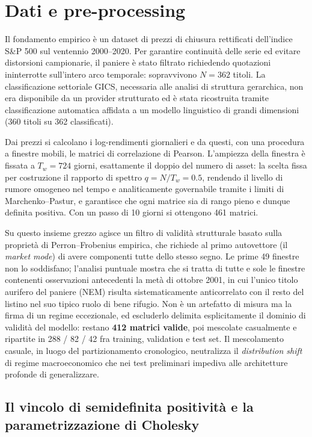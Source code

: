\documentclass[11pt,a4paper]{article}
\begin{document}
\section{Dati e pre-processing}

Il fondamento empirico è un dataset di prezzi di chiusura rettificati
dell'indice S\&P 500 sul ventennio 2000--2020. Per garantire continuità delle
serie ed evitare distorsioni campionarie, il paniere è stato filtrato
richiedendo quotazioni ininterrotte sull'intero arco temporale: sopravvivono
$N = 362$ titoli. La classificazione settoriale GICS, necessaria alle analisi
di struttura gerarchica, non era disponibile da un provider strutturato ed è
stata ricostruita tramite classificazione automatica affidata a un modello
linguistico di grandi dimensioni (360 titoli su 362 classificati).

Dai prezzi si calcolano i log-rendimenti giornalieri e da questi, con una
procedura a finestre mobili, le matrici di correlazione di Pearson. L'ampiezza
della finestra è fissata a $T_w = 724$ giorni, esattamente il doppio del
numero di asset: la scelta fissa per costruzione il rapporto di spettro
$q = N/T_w = 0.5$, rendendo il livello di rumore omogeneo nel tempo e
analiticamente governabile tramite i limiti di Marchenko--Pastur, e garantisce
che ogni matrice sia di rango pieno e dunque definita positiva. Con un passo
di 10 giorni si ottengono 461 matrici.

Su questo insieme grezzo agisce un filtro di validità strutturale basato sulla
proprietà di Perron--Frobenius empirica, che richiede al primo autovettore
(il \emph{market mode}) di avere componenti tutte dello stesso segno. Le prime
49 finestre non lo soddisfano; l'analisi puntuale mostra che si tratta di
tutte e sole le finestre contenenti osservazioni antecedenti la metà di
ottobre 2001, in cui l'unico titolo aurifero del paniere (NEM) risulta
sistematicamente anticorrelato con il resto del listino nel suo tipico ruolo
di bene rifugio. Non è un artefatto di misura ma la firma di un regime
eccezionale, ed escluderlo delimita esplicitamente il dominio di validità del
modello: restano \textbf{412 matrici valide}, poi mescolate casualmente e
ripartite in 288 / 82 / 42 fra training, validation e test set. Il
mescolamento casuale, in luogo del partizionamento cronologico, neutralizza il
\emph{distribution shift} di regime macroeconomico che nei test preliminari
impediva alle architetture profonde di generalizzare.

\subsection*{Il vincolo di semidefinita positività e la parametrizzazione di Cholesky}
\end{document}
